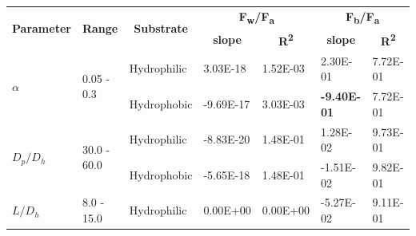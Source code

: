 \documentclass[english]{achemso}
\begin{document}
\begin{table}[H]
\begin{tabular}{|l|l|l|l|l|l|l|}
\hline
\multirow{2}{*}{\textbf{Parameter}} & \multirow{2}{*}{\textbf{Range}} & \multicolumn{1}{c|}{\multirow{2}{*}{\textbf{Substrate}}} & \multicolumn{2}{c|}{\textbf{F\textsubscript{w}/F\textsubscript{a}}}                                    & \multicolumn{2}{c|}{\textbf{F\textsubscript{b}/F\textsubscript{a}}}                                    \\ \cline{4-7} 
                                    &                                 & \multicolumn{1}{c|}{}                                    & \multicolumn{1}{c|}{\textbf{slope}} & \multicolumn{1}{c|}{\textbf{R\textsuperscript{2}}} & \multicolumn{1}{c|}{\textbf{slope}} & \multicolumn{1}{c|}{\textbf{R\textsuperscript{2}}} \\ \hline  \hline
\multirow{2}{*}{$\alpha$}              & \multirow{2}{*}{0.05 - 0.3}      & Hydrophilic                                              & 3.03E-18                                  & 1.52E-03                               & 2.30E-01                                  & 7.72E-01                               \\ \cline{3-7} 
                                    &                                 & Hydrophobic                                              & -9.69E-17                                 & 3.03E-03                               &\textbf{ -9.40E-01}                                 & 7.72E-01                               \\ \hline
\multirow{2}{*}{$D_p/D_h$}             & \multirow{2}{*}{30.0 - 60.0}     & Hydrophilic                                              & -8.83E-20                                 & 1.48E-01                               & 1.28E-02                                  & 9.73E-01                               \\ \cline{3-7} 
                                    &                                 & Hydrophobic                                              & -5.65E-18                                 & 1.48E-01                               & -1.51E-02                                 & 9.82E-01                               \\ \hline
\multirow{2}{*}{$L/D_{h}$}         & \multirow{2}{*}{8.0 - 15.0}      & Hydrophilic                                              & 0.00E+00                                  & 0.00E+00                               & -5.27E-02                                 & 9.11E-01                               \\ \cline{3-7} 

\end{tabular}
\end{table}
\end{document}
